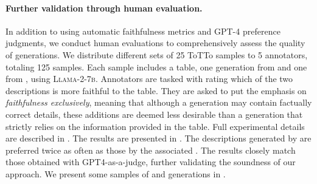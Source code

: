 \paragraph{Further validation through human evaluation.}

In addition to using automatic faithfulness metrics and GPT-4 preference judgments, we conduct human evaluations to comprehensively assess the quality of \scope generations. We distribute different sets of 25 ToTTo samples to 5 annotators, totaling 125 samples. Each sample includes a table, one generation from \scope and one from \sft, using \textsc{Llama-2-7b}. Annotators are tasked with rating which of the two descriptions is more faithful to the table. They are asked to put the emphasis on \emph{faithfulness exclusively}, meaning that although a generation may contain factually correct details, these additions are deemed less desirable than a generation that strictly relies on the information provided in the table. Full experimental details are described in .
The results are presented in .
The descriptions generated by \scope are preferred twice as often as those by the associated \sft. The results closely match those obtained with GPT4-as-a-judge, further validating the soundness of our approach. We present some samples of \scope and \sft generations in .





